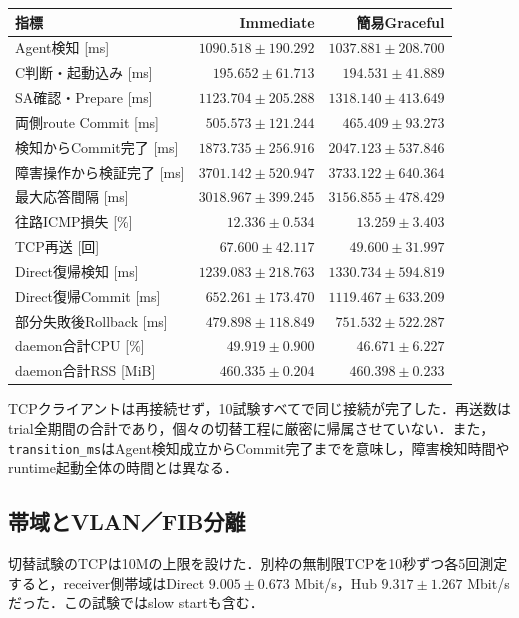 \documentclass[11pt,a4paper,twoside]{ltjsarticle}
\begin{document}
\begin{center}
\small
\begin{tabular}{lrr}
\toprule
指標 & Immediate & 簡易Graceful \\
\midrule
Agent検知 [ms] & $1090.518\pm190.292$ & $1037.881\pm208.700$ \\
C判断・起動込み [ms] & $195.652\pm61.713$ & $194.531\pm41.889$ \\
SA確認・Prepare [ms] & $1123.704\pm205.288$ & $1318.140\pm413.649$ \\
両側route Commit [ms] & $505.573\pm121.244$ & $465.409\pm93.273$ \\
検知からCommit完了 [ms] & $1873.735\pm256.916$ & $2047.123\pm537.846$ \\
障害操作から検証完了 [ms] & $3701.142\pm520.947$ & $3733.122\pm640.364$ \\
最大応答間隔 [ms] & $3018.967\pm399.245$ & $3156.855\pm478.429$ \\
往路ICMP損失 [\%] & $12.336\pm0.534$ & $13.259\pm3.403$ \\
TCP再送 [回] & $67.600\pm42.117$ & $49.600\pm31.997$ \\
Direct復帰検知 [ms] & $1239.083\pm218.763$ & $1330.734\pm594.819$ \\
Direct復帰Commit [ms] & $652.261\pm173.470$ & $1119.467\pm633.209$ \\
部分失敗後Rollback [ms] & $479.898\pm118.849$ & $751.532\pm522.287$ \\
daemon合計CPU [\%] & $49.919\pm0.900$ & $46.671\pm6.227$ \\
daemon合計RSS [MiB] & $460.335\pm0.204$ & $460.398\pm0.233$ \\
\bottomrule
\end{tabular}
\end{center}

TCPクライアントは再接続せず，10試験すべてで同じ接続が完了した．再送数はtrial全期間の合計であり，個々の切替工程に厳密に帰属させていない．また，\texttt{transition\_ms}はAgent検知成立からCommit完了までを意味し，障害検知時間やruntime起動全体の時間とは異なる．

\subsection{帯域とVLAN／FIB分離}

切替試験のTCPは10Mの上限を設けた．別枠の無制限TCPを10秒ずつ各5回測定すると，receiver側帯域はDirect $9.005\pm0.673$ Mbit/s，Hub $9.317\pm1.267$ Mbit/sだった．この試験ではslow startも含む．
\end{document}

